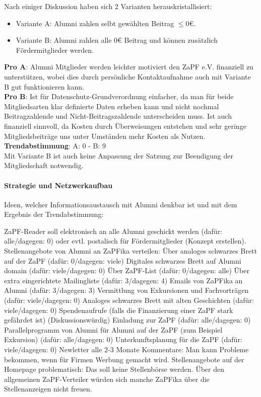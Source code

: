       Nach einiger Diskussion haben sich 2 Varianten herauskristallisiert:
      \begin{itemize}
        \item Variante A: Alumni zahlen selbt gewählten Beitrag $\leq 0 \euro$.
        \item Variante B: Alumni zahlen alle $0 \euro$ Beitrag und können zusätzlich Fördermitglieder werden.
      \end{itemize}
      \textbf{Pro A}: Alumni Mitglieder werden leichter motiviert den ZaPF e.V. finanziell zu unterstützen, wobei dies durch persönliche Kontaktaufnahme auch mit Variante B gut funktionieren kann. \\
      \textbf{Pro B}: Ist für Datenschutz-Grundverordnung einfacher, da man für beide Mitgliedsarten klar definierte Daten erheben kann und nicht nochmal Beitragzahlende und Nicht-Beitragszahlende unterscheiden muss. Ist auch finanziell sinnvoll, da Kosten durch Überweisungen entstehen und sehr geringe Mitgliedsbeiträge uns unter Umständen mehr Kosten als Nutzen. \\

      \textbf{Trendabstimmung}: A: 0 -  B: 9 \\

      Mit Variante B ist auch keine Anpassung der Satzung zur Beendigung der Mitgliedschaft notwendig. \\

      \paragraph{Strategie und Netzwerkaufbau}
        Ideen, welcher Informationsaustausch mit Alumni denkbar ist und mit dem Ergebnis der Trendabstimmung:
        \begin{outline}
          \1 ZaPF-Reader soll elektronisch an alle Alumni geschickt werden (dafür: alle/dagegen: 0) oder evtl. postalisch für Fördermitglieder (Konzept erstellen).
          \1 Stellenangebote von Alumni an ZaPFika verteilen:
            \2 Über analoges schwarzes Brett auf der ZaPF (dafür: 0/dagegen: viele)
            \2 Digitales schwarzes Brett auf Alumni domain (dafür: viele/dagegen: 0)
            \2 Über ZaPF-List (dafür: 0/dagegen: alle)
            \2 Über extra eingerichtete Mailingliste (dafür: 3/dagegen: 4)
            \2 Emails von ZaPFika an Alumni (dafür: 3/dagegen: 3)
          \1 Vermittlung von Exkursionen und Fachvorträgen (dafür: viele/dagegen: 0)
          \1 Analoges schwarzes Brett mit alten Geschichten (dafür: viele/dagegen: 0)
          \1 Spendenaufrufe (falls die Finanzierung einer ZaPF stark gefährdet ist) (Diskussionswürdig)
          \1 Einladung zur ZaPF (dafür: alle/dagegen: 0)
          \1 Parallelprogramm von Alumni für Alumni auf der ZaPF (zum Beispiel Exkursion) (dafür: alle/dagegen: 0)
          \1 Unterkunftsplanung für die ZaPF (dafür: viele/dagegen: 0)
          \1 Newletter alle 2-3 Monate
          \1 Kommentare: Man kann Probleme bekommen, wenn für Firmen Werbung gemacht wird. Stellenangebote auf der Homepage problematisch: Das soll keine Stellenbörse werden. Über den allgemeinen ZaPF-Verteiler würden sich manche ZaPFika über die Stellenanzeigen nicht freuen.
        \end{outline}


